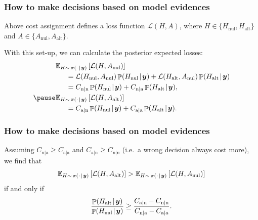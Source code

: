 \documentclass[18pt]{beamer}
\newcommand{\defineTightSpacing}{%
	\setlength{\abovedisplayskip}{.25\baselineskip}%
	\setlength{\belowdisplayskip}{.25\baselineskip}%
}
\newcommand{\given}{\mskip.7\thinmuskip | \mskip.7\thinmuskip}
\DeclareMathOperator{\probability}{\mathbb{P}}
\newcommand{\expectation}{\mathbb{E}}
\newcommand{\density}{\operatorname{\pi}}
\newcommand{\by}{\bm{y}}
\newcommand{\hypothesis}{H}
\renewcommand{\action}{A}
\newcommand{\loss}{\mathcal{L}}
\newcommand{\nullSub}{\mathrm{nul}}
\newcommand{\altSub}{\mathrm{alt}}
\begin{document}
\begin{frame}
\frametitle{How to make decisions based on model evidences}
Above cost assignment defines a loss function $\loss(\hypothesis, \action)$, where $\hypothesis \in \{ \hypothesis_\nullSub, \hypothesis_\altSub \}$ and $\action \in \{ \action_\nullSub, \action_\altSub \}$. 

\pause
With this set-up, we can calculate the posterior expected losses:
\begin{equation*} \defineTightSpacing%
\begin{aligned}
&\expectation_{\hypothesis \sim \, \density(\cdot \given \by)} \left[
	\loss(\hypothesis, \action_\nullSub)
\right] \\
	&\hspace*{1.5em}= \loss(\hypothesis_\nullSub, \action_\nullSub) \probability(\hypothesis_\nullSub \given \by)
		+ \loss(\hypothesis_\altSub, \action_\nullSub) \probability(\hypothesis_\altSub \given \by) \\
	&\hspace*{1.5em}= C_{\mathrm{n | n}} \probability(\hypothesis_\nullSub \given \by)
		+ C_{\mathrm{n | a}} \probability(\hypothesis_\altSub \given \by), \\
	\pause
&\expectation_{\hypothesis \sim \, \density(\cdot \given \by)} \left[
	\loss(\hypothesis, \action_\altSub)
\right] \\
	&\hspace*{1.5em}= C_{\mathrm{a | n}} \probability(\hypothesis_\nullSub \given \by)
		+ C_{\mathrm{a | a}} \probability(\hypothesis_\altSub \given \by).
\end{aligned}
\end{equation*}
\end{frame}


\begin{frame}
\frametitle{How to make decisions based on model evidences}
Assuming $C_{\mathrm{n | a}} \geq C_{\mathrm{a | a}}$ and $C_{\mathrm{a | n}} \geq C_{\mathrm{n | n}}$ (i.e.\ a wrong decision always cost more), 
we find that
\pause
\begin{equation*} \defineTightSpacing%
\expectation_{\hypothesis \sim \, \density(\cdot \given \by)} \left[
	\loss(\hypothesis, \action_\altSub)
\right]
	> 
\expectation_{\hypothesis \sim \, \density(\cdot \given \by)} \left[
	\loss(\hypothesis, \action_\nullSub)
\right] 
\end{equation*}
if and only if
\begin{equation*} \defineTightSpacing%
\frac{
	\probability(\hypothesis_\altSub \given \by) 
}{
	\probability(\hypothesis_\nullSub \given \by)
} \geq
	\frac{
		C_{\mathrm{a | n}} - C_{\mathrm{n | n}}
	}{
		C_{\mathrm{n | a}} - C_{\mathrm{a | a}}
	}.
\end{equation*}
\end{frame}
\end{document}
